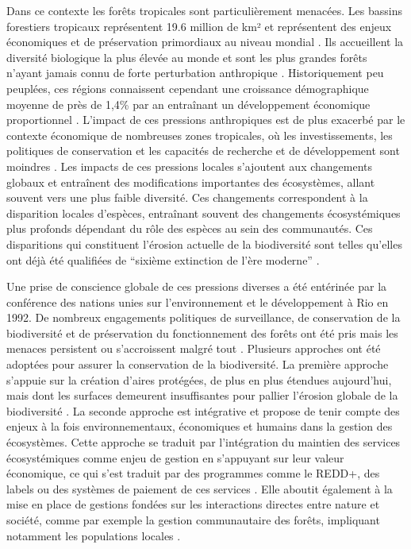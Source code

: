 \documentclass[
  11pt,
  french,
  A4paper,
  extrafontsizes,onecolumn,openright
  ]{memoir}
\begin{document}
Dans ce contexte les forêts tropicales sont particulièrement menacées.
Les bassins forestiers tropicaux représentent 19.6 million de km² et
représentent des enjeux économiques et de préservation primordiaux au
niveau mondial \autocites{Dirzo2003a}{Hansen2013}. Ils accueillent la
diversité biologique la plus élevée au monde et sont les plus grandes
forêts n'ayant jamais connu de forte perturbation anthropique
\autocites{Gentry1988}{FAO2011}. Historiquement peu peuplées, ces
régions connaissent cependant une croissance démographique moyenne de
près de 1,4\% par an entraînant un développement économique
proportionnel \autocites{Asner2009}{Barlow2018}. L'impact de ces
pressions anthropiques est de plus exacerbé par le contexte économique
de nombreuses zones tropicales, où les investissements, les politiques
de conservation et les capacités de recherche et de développement sont
moindres \autocite{seeBarlow2018}. Les impacts de ces pressions locales
s'ajoutent aux changements globaux et entraînent des modifications
importantes des écosystèmes, allant souvent vers une plus faible
diversité. Ces changements correspondent à la disparition locales
d'espèces, entraînant souvent des changements écosystémiques plus
profonds dépendant du rôle des espèces au sein des communautés. Ces
disparitions qui constituent l'érosion actuelle de la biodiversité sont
telles qu'elles ont déjà été qualifiées de ``sixième extinction de l'ère
moderne'' \autocites{Vitousek1997}{Cardinale2012}.

Une prise de conscience globale de ces pressions diverses a été
entérinée par la conférence des nations unies sur l'environnement et le
développement à Rio en 1992. De nombreux engagements politiques de
surveillance, de conservation de la biodiversité et de préservation du
fonctionnement des forêts ont été pris mais les menaces persistent ou
s'accroissent malgré tout
\autocites{Summit1992}{Schlaepfer2000}{Dirzo2003a}{Morales-Hidalgo2015}.
Plusieurs approches ont été adoptées pour assurer la conservation de la
biodiversité. La première approche s'appuie sur la création d'aires
protégées, de plus en plus étendues aujourd'hui, mais dont les surfaces
demeurent insuffisantes pour pallier l'érosion globale de la
biodiversité \autocite{Sist2015}. La seconde approche est intégrative et
propose de tenir compte des enjeux à la fois environnementaux,
économiques et humains dans la gestion des écosystèmes. Cette approche
se traduit par l'intégration du maintien des services écosystémiques
comme enjeu de gestion en s'appuyant sur leur valeur économique, ce qui
s'est traduit par des programmes comme le REDD+, des labels ou des
systèmes de paiement de ces services
\autocites{Agrawal2011}{Barlow2018}. Elle aboutit également à la mise en
place de gestions fondées sur les interactions directes entre nature et
société, comme par exemple la gestion communautaire des forêts,
impliquant notamment les populations locales \autocite{Liu2015}.
\end{document}
